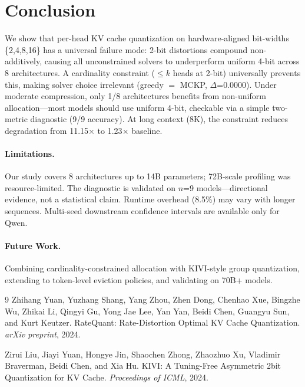 \documentclass[11pt,a4paper]{article}
\begin{document}
\section{Conclusion}
\label{sec:conclusion}

We show that per-head KV cache quantization on hardware-aligned bit-widths \{2,4,8,16\} has a universal failure mode: 2-bit distortions compound non-additively, causing all unconstrained solvers to underperform uniform 4-bit across 8 architectures.
A cardinality constraint ($\le k$ heads at 2-bit) universally prevents this, making solver choice irrelevant (greedy $=$ MCKP, $\Delta$=0.0000).
Under moderate compression, only 1/8 architectures benefits from non-uniform allocation---most models should use uniform 4-bit, checkable via a simple two-metric diagnostic (9/9 accuracy).
At long context (8K), the constraint reduces degradation from 11.15$\times$ to 1.23$\times$ baseline.

\paragraph{Limitations.}
Our study covers 8 architectures up to 14B parameters; 72B-scale profiling was resource-limited. The diagnostic is validated on $n$=9 models---directional evidence, not a statistical claim. Runtime overhead (8.5\%) may vary with longer sequences. Multi-seed downstream confidence intervals are available only for Qwen.

\paragraph{Future Work.}
Combining cardinality-constrained allocation with KIVI-style group quantization, extending to token-level eviction policies, and validating on 70B+ models.

\begin{thebibliography}{9}
Zhihang Yuan, Yuzhang Shang, Yang Zhou, Zhen Dong, Chenhao Xue, Bingzhe Wu, Zhikai Li, Qingyi Gu, Yong Jae Lee, Yan Yan, Beidi Chen, Guangyu Sun, and Kurt Keutzer.
{RateQuant: Rate-Distortion Optimal KV Cache Quantization}.
\emph{arXiv preprint}, 2024.

Zirui Liu, Jiayi Yuan, Hongye Jin, Shaochen Zhong, Zhaozhuo Xu, Vladimir Braverman, Beidi Chen, and Xia Hu.
{KIVI: A Tuning-Free Asymmetric 2bit Quantization for KV Cache}.
\emph{Proceedings of ICML}, 2024.
\end{thebibliography}
\end{document}
